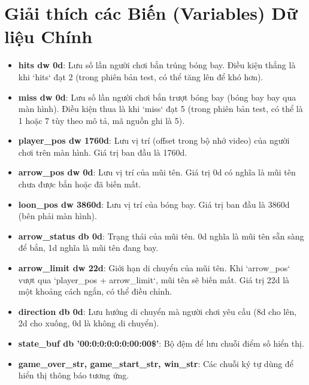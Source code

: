 \documentclass[12pt,a4paper,openany,oneside]{report}
\begin{document}
\section{Giải thích các Biến (Variables) Dữ liệu Chính}
\begin{itemize}
    \item \textbf{hits dw 0d}: Lưu số lần người chơi bắn trúng bóng bay. Điều kiện thắng là khi `hits` đạt 2 (trong phiên bản test, có thể tăng lên để khó hơn).
    \item \textbf{miss dw 0d}: Lưu số lần người chơi bắn trượt bóng bay (bóng bay bay qua màn hình). Điều kiện thua là khi `miss` đạt 5 (trong phiên bản test, có thể là 1 hoặc 7 tùy theo mô tả, mã nguồn ghi là 5).
    \item \textbf{player\_pos dw 1760d}: Lưu vị trí (offset trong bộ nhớ video) của người chơi trên màn hình. Giá trị ban đầu là 1760d.
    \item \textbf{arrow\_pos dw 0d}: Lưu vị trí của mũi tên. Giá trị 0d có nghĩa là mũi tên chưa được bắn hoặc đã biến mất.
    \item \textbf{loon\_pos dw 3860d}: Lưu vị trí của bóng bay. Giá trị ban đầu là 3860d (bên phải màn hình).
    \item \textbf{arrow\_status db 0d}: Trạng thái của mũi tên. 0d nghĩa là mũi tên sẵn sàng để bắn, 1d nghĩa là mũi tên đang bay.
    \item \textbf{arrow\_limit dw 22d}: Giới hạn di chuyển của mũi tên. Khi `arrow_pos` vượt qua `player_pos + arrow_limit`, mũi tên sẽ biến mất. Giá trị 22d là một khoảng cách ngắn, có thể điều chỉnh.
    \item \textbf{direction db 0d}: Lưu hướng di chuyển mà người chơi yêu cầu (8d cho lên, 2d cho xuống, 0d là không di chuyển).
    \item \textbf{state\_buf db '00:0:0:0:0:0:00:00\$'}: Bộ đệm để lưu chuỗi điểm số hiển thị.
    \item \textbf{game\_over\_str, game\_start\_str, win\_str}: Các chuỗi ký tự dùng để hiển thị thông báo tương ứng.
\end{itemize}
\end{document}
